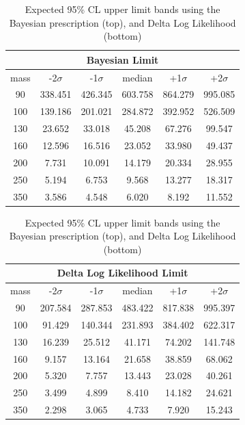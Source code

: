 \begin{table}
  \begin{center}
    \begin{tabular}{|c|c|c|c|c|c|}
    \hline
    \multicolumn{6}{|c|}{Bayesian Limit} \\
    \hline
   mass &-2$\sigma$&-1$\sigma$&   median &+1$\sigma$&+2$\sigma$\\  \hline
     90 &  338.451 &  426.345  &  603.758 &  864.279 &  995.085 \\
    100 &  139.186 &  201.021  &  284.872 &  392.952 &  526.509 \\
    130 &   23.652 &   33.018  &   45.208 &   67.276 &   99.547 \\
    160 &   12.596 &   16.516  &   23.052 &   33.980 &   49.437 \\
    200 &    7.731 &   10.091  &   14.179 &   20.334 &   28.955 \\
    250 &    5.194 &    6.753  &    9.568 &   13.277 &   18.317 \\
    350 &    3.586 &    4.548  &    6.020 &    8.192 &   11.552 \\  \hline
    \end{tabular}
    \begin{tabular}{|c|c|c|c|c|c|}
    \hline
    \multicolumn{6}{|c|}{Delta Log Likelihood Limit} \\
    \hline
   mass &-2$\sigma$&-1$\sigma$&   median &+1$\sigma$&+2$\sigma$\\  \hline
     90 &  207.584 &  287.853  &  483.422 &  817.838 &  995.397 \\
    100 &   91.429 &  140.344  &  231.893 &  384.402 &  622.317 \\
    130 &   16.239 &   25.512  &   41.171 &   74.202 &  141.748 \\
    160 &    9.157 &   13.164  &   21.658 &   38.859 &   68.062 \\
    200 &    5.320 &    7.757  &   13.443 &   23.028 &   40.261 \\
    250 &    3.499 &    4.899  &    8.410 &   14.182 &   24.621 \\
    350 &    2.298 &    3.065  &    4.733 &    7.920 &   15.243 \\  \hline
    \end{tabular}
    \caption[Expected 95\% CL $\sigma \times \text{BR}$ upper limits] {Expected
    95\% CL upper limit bands using the Bayesian prescription (top), and Delta
    Log Likelihood (bottom)}
    \label{tab-exp-limit-TaNC}
  \end{center}
\end{table}

